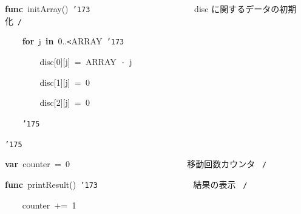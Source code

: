 \documentclass[a4paper,10pt]{article}
\def\mc{\relax}
\begin{document}
\noindent
\mbox{}\hfill

\noindent
\mbox{}\textbf{func}{\tt\mc \ }initArray(){\tt\mc \ }{\tt\char'173}{\tt\mc \ }{\tt\mc \ }{\tt\mc \ }{\tt\mc \ }{\tt\mc \ }{\tt\mc \ }{\tt\mc \ }{\tt\mc \ }{\tt\mc \ }{\tt\mc \ }{\tt\mc \ }{\tt\mc \ }{\tt\mc \ }{\tt\mc \ }{\tt\mc \ }{\tt\mc \ }{\tt\mc \ }{\tt\mc \ }{\tt\mc \ }{\tt\mc \ }{\tt\mc \ }{\tt\mc \ }\rm\mc {\tt /}{\tt *}\  \ disc に関するデータの初期化\hfill \rm\mc \ {\tt *}{\tt /}
\tt\mc 

\noindent
\mbox{}{\tt\mc \ }{\tt\mc \ }{\tt\mc \ }{\tt\mc \ }\textbf{for}{\tt\mc \ }j{\tt\mc \ }\textbf{in}{\tt\mc \ }0..{\tt <}ARRAY{\tt\mc \ }{\tt\char'173}

\noindent
\mbox{}{\tt\mc \ }{\tt\mc \ }{\tt\mc \ }{\tt\mc \ }{\tt\mc \ }{\tt\mc \ }{\tt\mc \ }{\tt\mc \ }disc[0][j]{\tt\mc \ }={\tt\mc \ }ARRAY{\tt\mc \ }{\tt -}{\tt\mc \ }j

\noindent
\mbox{}{\tt\mc \ }{\tt\mc \ }{\tt\mc \ }{\tt\mc \ }{\tt\mc \ }{\tt\mc \ }{\tt\mc \ }{\tt\mc \ }disc[1][j]{\tt\mc \ }={\tt\mc \ }0

\noindent
\mbox{}{\tt\mc \ }{\tt\mc \ }{\tt\mc \ }{\tt\mc \ }{\tt\mc \ }{\tt\mc \ }{\tt\mc \ }{\tt\mc \ }disc[2][j]{\tt\mc \ }={\tt\mc \ }0

\noindent
\mbox{}{\tt\mc \ }{\tt\mc \ }{\tt\mc \ }{\tt\mc \ }{\tt\char'175}

\noindent
\mbox{}{\tt\char'175}

\noindent
\mbox{}\hfill

\noindent
\mbox{}\textbf{var}{\tt\mc \ }counter{\tt\mc \ }={\tt\mc \ }0{\tt\mc \ }{\tt\mc \ }{\tt\mc \ }{\tt\mc \ }{\tt\mc \ }{\tt\mc \ }{\tt\mc \ }{\tt\mc \ }{\tt\mc \ }{\tt\mc \ }{\tt\mc \ }{\tt\mc \ }{\tt\mc \ }{\tt\mc \ }{\tt\mc \ }{\tt\mc \ }{\tt\mc \ }{\tt\mc \ }{\tt\mc \ }{\tt\mc \ }{\tt\mc \ }{\tt\mc \ }{\tt\mc \ }{\tt\mc \ }{\tt\mc \ }\rm\mc {\tt /}{\tt *}\  \ 移動回数カウンタ \hfill \rm\mc \ {\tt *}{\tt /}
\tt\mc 

\noindent
\mbox{}\hfill

\noindent
\mbox{}\textbf{func}{\tt\mc \ }printResult(){\tt\mc \ }{\tt\char'173}{\tt\mc \ }{\tt\mc \ }{\tt\mc \ }{\tt\mc \ }{\tt\mc \ }{\tt\mc \ }{\tt\mc \ }{\tt\mc \ }{\tt\mc \ }{\tt\mc \ }{\tt\mc \ }{\tt\mc \ }{\tt\mc \ }{\tt\mc \ }{\tt\mc \ }{\tt\mc \ }{\tt\mc \ }{\tt\mc \ }{\tt\mc \ }{\tt\mc \ }\rm\mc {\tt /}{\tt *}\  \ 結果の表示 \hfill \rm\mc \ {\tt *}{\tt /}
\tt\mc 

\noindent
\mbox{}{\tt\mc \ }{\tt\mc \ }{\tt\mc \ }{\tt\mc \ }counter{\tt\mc \ }+={\tt\mc \ }1
\end{document}
